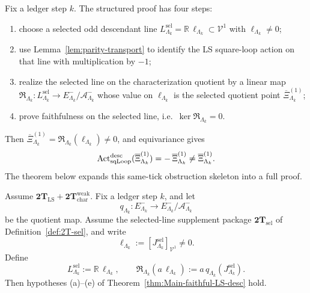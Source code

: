 \begin{remark}
\label{rem:Main-faithfulness-skeleton}
Fix a ledger step \(k\).
The structured proof has four steps:
\begin{enumerate}[label=\textnormal{(\roman*)},leftmargin=*,itemsep=0.3em]
\item choose a selected odd descendant line
  \(L^{\mathrm{sel}}_{\Lambda_k}=\mathbb R\,\ell_{\Lambda_k}\subset\mathcal V^1\)
  with \(\ell_{\Lambda_k}\neq 0\);
\item use Lemma~\ref{lem:parity-transport} to identify the LS square-loop action on
  that line with multiplication by \(-1\);
\item realize the selected line on the characterization quotient by a linear map
  \(\mathfrak R_{\Lambda_k}:L^{\mathrm{sel}}_{\Lambda_k}\to
  E^-_{\Lambda_k}/\mathcal A^-_{\Lambda_k}\) whose value on
  \(\ell_{\Lambda_k}\) is the selected quotient point
  \(\overline{\Xi}^{(1)}_{\Lambda_k}\);
\item prove faithfulness on the selected line, i.e.\ \(\ker\mathfrak R_{\Lambda_k}=0\).
\end{enumerate}
Then \(\overline{\Xi}^{(1)}_{\Lambda_k}=\mathfrak R_{\Lambda_k}(\ell_{\Lambda_k})\neq 0\),
and equivariance gives
\[
\mathrm{Act}^{\mathrm{desc}}_{\mathrm{sqLoop}}(\overline{\Xi}^{(1)}_{\Lambda_k})
=
-\,\overline{\Xi}^{(1)}_{\Lambda_k}
\neq
\overline{\Xi}^{(1)}_{\Lambda_k}.
\]
The theorem below expands this same-tick obstruction skeleton into a full proof.
\end{remark}

\begin{proposition}
\label{prop:Main-selected-line-compatibility}
Assume \(\mathbf{2T}_{\mathrm{LS}}+\mathbf{2T}_{\mathrm{char}}^{\mathrm{weak}}\).
Fix a ledger step \(k\), and let
\[
q_{\Lambda_k}:E^-_{\Lambda_k}\longrightarrow E^-_{\Lambda_k}/\mathcal A^-_{\Lambda_k}
\]
be the quotient map.
Assume the selected-line supplement package
\(\mathbf{2T}_{\mathrm{sel}}\) of Definition~\ref{def:2T-sel}, and write
\[
\ell_{\Lambda_k}
:=
[J^{\mathrm{sel}}_{\Lambda_k}]_{\mathcal V^1}
\neq 0.
\]
Define
\[
L^{\mathrm{sel}}_{\Lambda_k}
:=
\mathbb R\,\ell_{\Lambda_k},
\qquad
\mathfrak R_{\Lambda_k}(a\,\ell_{\Lambda_k})
:=
a\,q_{\Lambda_k}(J^{\mathrm{sel}}_{\Lambda_k}).
\]
Then hypotheses \textnormal{(a)}--\textnormal{(e)} of
Theorem~\ref{thm:Main-faithful-LS-desc} hold.
\end{proposition}


